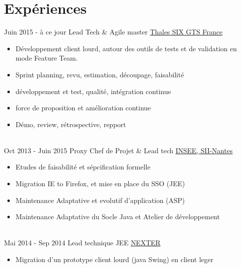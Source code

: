 \documentclass[letterpaper]{twentysecondcv} %
\begin{document}
\makeprofile %


\section{Expériences}

\begin{twenty} %
\twentyitem
    	{Juin 2015 -}
		{à ce jour}
        {Lead Tech \& Agile master}
        {\href{https://www.thalesgroup.com/fr}{Thales SIX GTS France}}
        {}
        {\begin{itemize} 		
      	\item Développement client lourd, autour des outils de tests et de validation en mode Feature Team.
        \item Sprint planning, revu, estimation, découpage, faisabilité
        \item développement et test, qualité, intégration continue
        \item force de proposition et amélioration continue
        \item Démo, review, rétrospective, repport
        \end{itemize}}
        \\
	\twentyitem
    	{Oct 2013 -}
		{Juin 2015}
        {Proxy Chef de Projet \& Lead tech}
        {\href{https://www.insee.fr/fr/accueil}{INSEE, SII-Nantes}}
        {}
        {
        {\begin{itemize}
		\item Etudes de faisabilité et sépcification formelle
		\item Migration IE to Firefox, et mise en place du SSO (JEE)
		\item Maintenance Adaptative et evolutif d'application (ASP)
		\item Maintenance Adaptative du Socle Java et Atelier de développement
    	\end{itemize}}
        }
    \\   
    \twentyitem
   		{Mai 2014 -}
		{Sep 2014}
        {Lead technique JEE}
        {\href{https://www.nexter-group.fr/}{NEXTER}}
        {}
        {
        {\begin{itemize}
     		\item Migration d'un prototype client lourd (java Swing) en client leger

\end{itemize}}}
\end{twenty}
\end{document}
